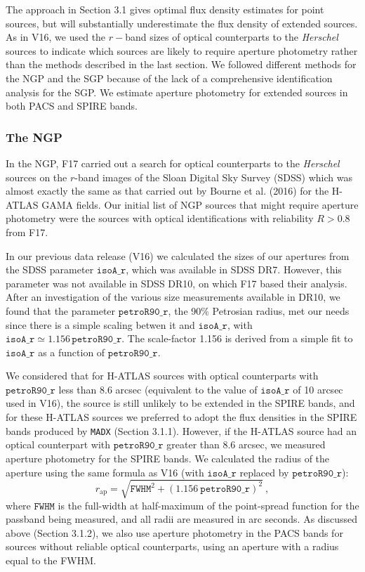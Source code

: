 \documentclass[a4paper,fleqn,usenatbib, twocolumn]{aastex61}
\begin{document}
The approach in Section 3.1 gives optimal flux density estimates for
point sources, but will substantially underestimate the flux density
of extended sources.  As in V16, we used the $r-$band sizes of optical
counterparts to the {\it Herschel} sources to indicate which sources
are likely to require aperture photometry rather than the methods
described in the last section.  We followed different methods for the
NGP and the SGP because of the lack of a comprehensive identification
analysis for the SGP. We estimate aperture photometry for extended
sources in both PACS and SPIRE bands.

\subsubsection{The NGP}

In the NGP, F17 carried out a search for optical counterparts to the
{\it Herschel} sources on the $r$-band images of the Sloan Digital Sky
Survey (SDSS) which was almost exactly the same as that carried out by
Bourne et al. (2016) for the H-ATLAS GAMA fields.  Our initial list of
NGP sources that might require aperture photometry were the sources
with optical identifications with reliability $R>0.8$ from F17.

In our previous data release (V16) we calculated the sizes of our
apertures from the SDSS parameter $\mathtt{isoA\_r}$, which was
available in SDSS DR7. However, this parameter was not available in
SDSS DR10, on which F17 based their analysis.  After an investigation
of the various size measurements available in DR10, we found that the
parameter $\mathtt{petroR90\_r}$, the 90\% Petrosian radius, met our
needs since there is a simple scaling betwen it and
$\mathtt{isoA\_r}$, with
$\mathtt{isoA\_r} \simeq 1.156 \, \mathtt{petroR90\_r}$.
The scale-factor 1.156 is derived from a simple fit to
$\mathtt{isoA\_r}$ as a function of $\mathtt{petroR90\_r}$.

We considered that for H-ATLAS sources with optical counterparts with
$\mathtt{petroR90\_r}$ less than 8.6 arcsec (equivalent to the value
of $\mathtt{isoA\_r}$ of 10 arcsec used in V16), the source is still
unlikely to be extended in the SPIRE bands, and for these H-ATLAS
sources we preferred to adopt the flux densities in the SPIRE bands produced by
{\tt MADX} (Section 3.1.1).  However, if the H-ATLAS source had an
optical counterpart with $\mathtt{petroR90\_r}$ greater than 8.6
arcsec, we measured aperture photometry for the SPIRE bands. We
calculated the radius of the aperture using the same formula as V16
(with $\mathtt{isoA\_r}$ replaced by $\mathtt{petroR90\_r}$):
\smallskip
\begin{equation} 
r_\mathrm{ap} = \sqrt{ \mathtt{FWHM}^2 + {(1.156
    \ \mathtt{petroR90\_r})}^2}\ , 
\end{equation}
where $\mathtt{FWHM}$ is the full-width at half-maximum of the
point-spread function for the passband being measured, and all radii
are measured in arc seconds. As discussed
above (Section 3.1.2), we also use aperture photometry in the PACS
bands for sources without reliable optical counterparts, using an
aperture with a radius equal to the FWHM.
\end{document}
